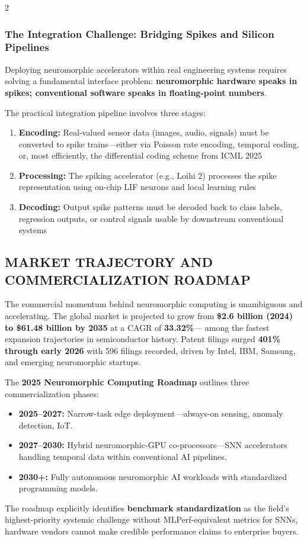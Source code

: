 \begin{multicols}{2}
  \subsubsection*{The Integration Challenge: Bridging Spikes and Silicon Pipelines}
  Deploying neuromorphic accelerators within real engineering systems requires solving a fundamental interface
  problem: \textbf{neuromorphic hardware speaks in spikes; conventional software speaks in floating-point
  numbers}.

  \noindent
  The practical integration pipeline involves three stages:
  \begin{enumerate}
    \item \textbf{Encoding:} Real-valued sensor data (images, audio, signals) must be converted to spike trains---either
      via Poisson rate encoding, temporal coding, or, most efficiently, the differential coding scheme from
      ICML 2025
    \item \textbf{Processing:} The spiking accelerator (e.g., Loihi 2) processes the spike representation using on-chip
      LIF neurons and local learning rules
    \item \textbf{Decoding:} Output spike patterns must be decoded back to class labels, regression outputs, or control
      signals usable by downstream conventional systems
  \end{enumerate}

  \subsection*{\centering\uppercase{Market Trajectory and Commercialization Roadmap}}
  The commercial momentum behind neuromorphic computing is unambiguous and accelerating. The global
  market is projected to grow from \textbf{\$2.6 billion (2024) to \$61.48 billion by 2035} at a CAGR of \textbf{33.32\%}---
  among the fastest expansion trajectories in semiconductor history. Patent filings surged \textbf{401\% through early
  2026} with 596 filings recorded, driven by Intel, IBM, Samsung, and emerging neuromorphic startups.

  \noindent
  \begin{justify}
    The \textbf{2025 Neuromorphic Computing Roadmap} outlines three commercialization phases:
    \begin{itemize}
      \item \textbf{2025--2027:} Narrow-task edge deployment---always-on sensing, anomaly detection, IoT.
      \item \textbf{2027--2030:} Hybrid neuromorphic-GPU co-processors---SNN accelerators handling temporal data within conventional AI pipelines.
      \item \textbf{2030+:} Fully autonomous neuromorphic AI workloads with standardized programming models.
    \end{itemize}
  \end{justify}
  The roadmap explicitly identifies \textbf{benchmark standardization} as the field's highest-priority systemic challenge
  without MLPerf-equivalent metrics for SNNs, hardware vendors cannot make credible performance claims to
  enterprise buyers.

\end{multicols}
